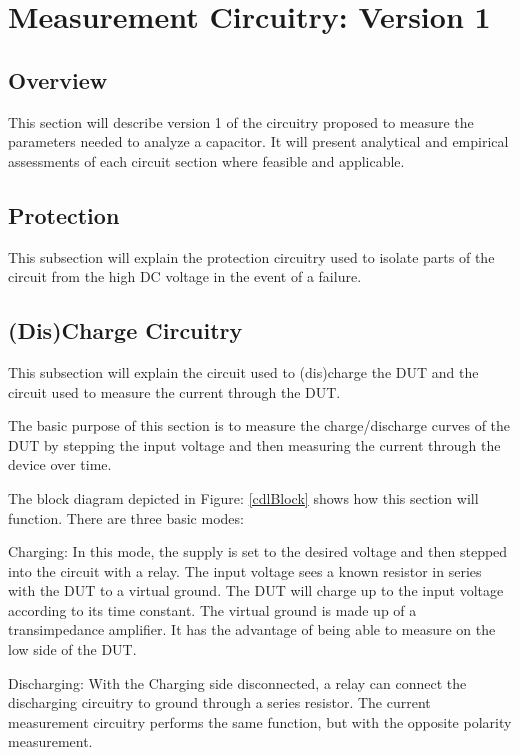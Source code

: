 \section {Measurement Circuitry: Version 1}

\subsection {Overview}

This section will describe version 1 of the circuitry proposed to measure the parameters needed to analyze a capacitor. It will present analytical and empirical assessments of each circuit section where feasible and applicable.

\subsection {Protection}

This subsection will explain the protection circuitry used to isolate parts of the circuit from the high DC voltage in the event of a failure.

\subsection {(Dis)Charge Circuitry}

This subsection will explain the circuit used to (dis)charge the DUT and the circuit used to measure the current through the DUT.

The basic purpose of this section is to measure the charge/discharge curves of the DUT by stepping the input voltage and then measuring the current through the device over time.



The block diagram depicted in Figure: \ref{cdlBlock} shows how this section will function. There are three basic modes:

Charging:
In this mode, the supply is set to the desired voltage and then stepped into the circuit with a relay. The input voltage sees a known resistor in series with the DUT to a virtual ground. The DUT will charge up to the input voltage according to its time constant. The virtual ground is made up of a transimpedance amplifier. It has the advantage of being able to measure on the low side of the DUT.

Discharging:
With the Charging side disconnected, a relay can connect the discharging circuitry to ground through a series resistor. The current measurement circuitry performs the same function, but with the opposite polarity measurement.

